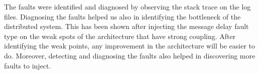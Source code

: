 The faults were identified and diagnosed by observing the stack trace on the log files. Diagnosing the faults helped us also in identifying the bottleneck of the distributed system. This has been shown after injecting the message delay fault type on the weak spots of the architecture that have strong coupling. After identifying the weak points, any improvement in the architecture will be easier to do. Moreover, detecting and diagnosing the faults also helped in discovering more faults to inject. 




